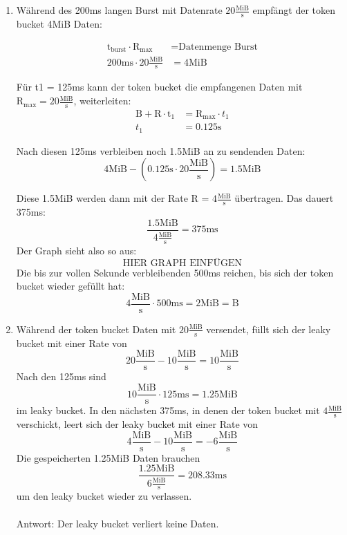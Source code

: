 \documentclass[a4paper,
			llpt,
			solution,
			accentcolor=tud2d,
			colorbacktitle
			]
			{tudexercise}
\newcommand{\MiBs}{\frac{\mathrm{MiB}}{\mathrm{s}}}
\begin{document}
\section{}
\begin{enumerate}
\item
Während des 200ms langen Burst mit Datenrate $20\MiBs$ empfängt der token bucket 4MiB Daten: 

\begin{align*}
\text{t}_\text{burst}  \cdot \text{R}_\text{max} &= \text{Datenmenge Burst}
\\
200\mathrm{ms} \cdot 20\MiBs &= \mathrm{4MiB}
\end{align*}


Für t1 = 125ms kann der token bucket die empfangenen Daten mit $\mathrm{R}_{\mathrm{max}} = 20\MiBs$, weiterleiten:
\begin{align*}
\mathrm{B} + \mathrm{R}\cdot\mathrm{t}_1 &= \mathrm{R}_ {\mathrm{max}} \cdot t_1
\\
t_1 &= 0.125\mathrm{s}
\end{align*}

Nach diesen 125ms verbleiben noch 1.5MiB an zu sendenden Daten:
$$4\mathrm{MiB} - \left(0.125\mathrm{s} \cdot 20\MiBs\right) = 1.5 \mathrm{MiB}$$

Diese 1.5MiB werden dann mit der Rate R = $4\MiBs
$
übertragen. Das dauert 375ms:
$$
\frac{1.5 \mathrm{MiB}}{ 4 \MiBs} = 375\mathrm{ms}
$$
Der Graph sieht also so aus:
$$\text{HIER GRAPH EINFÜGEN}$$
Die bis zur vollen Sekunde verbleibenden 500ms reichen, bis sich der token bucket wieder gefüllt hat: 
$$
4\MiBs \cdot 500\mathrm{ms} = 2\mathrm{MiB} = \mathrm{B}
$$
\item
Während der token bucket Daten mit $20\MiBs$ versendet, füllt sich der leaky bucket mit einer Rate von
$$
20 \MiBs - 10\MiBs = 10\MiBs
$$
Nach den 125ms sind
$$
10\MiBs  \cdot 125\mathrm{ms} = 1.25 \mathrm{MiB}
$$ im leaky bucket.
In den nächsten 375ms, in denen der token bucket mit $4\MiBs$ verschickt, leert sich der leaky bucket mit einer Rate von
$$
4\MiBs - 10\MiBs = -6 \MiBs
$$
Die gespeicherten 1.25MiB Daten brauchen
$$
\frac{1.25\mathrm{MiB}}{6\MiBs} = 208.33\mathrm{ms}
$$
um den leaky bucket wieder zu verlassen.
\\\\
Antwort: Der leaky bucket verliert keine Daten.
\end{enumerate}

\section{}
\section{}
\end{document}
